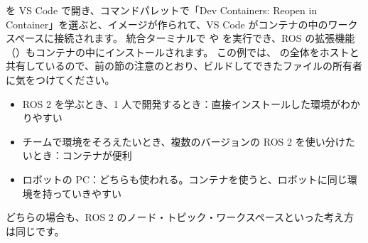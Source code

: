  を VS Code で開き、コマンドパレットで「Dev Containers: Reopen in Container」を選ぶと、イメージが作られて、VS Code がコンテナの中のワークスペースに接続されます。
統合ターミナルで  や  を実行でき、ROS の拡張機能（）もコンテナの中にインストールされます。
この例では、 の全体をホストと共有しているので、前の節の注意のとおり、ビルドしてできたファイルの所有者に気をつけてください。

\begin{point}[直接インストールとコンテナの使い分け]
  \begin{itemize}
    \item ROS 2 を学ぶとき、1 人で開発するとき：直接インストールした環境がわかりやすい
    \item チームで環境をそろえたいとき、複数のバージョンの ROS 2 を使い分けたいとき：コンテナが便利
    \item ロボットの PC：どちらも使われる。コンテナを使うと、ロボットに同じ環境を持っていきやすい
  \end{itemize}
  どちらの場合も、ROS 2 のノード・トピック・ワークスペースといった考え方は同じです。
\end{point}
